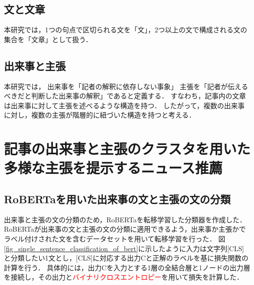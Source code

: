 \documentclass[12pt,a4j]{jreport}
\begin{document}
\subsection{文と文章}
本研究では，1つの句点で区切られる文を「文」，2つ以上の文で構成される文の集合を「文章」として扱う．

\subsection{出来事と主張}
本研究では，
出来事を「記者の解釈に依存しない事象」
主張を「記者が伝えるべきだと判断した出来事の解釈」であると定義する．
すなわち，記事内の文章は出来事に対して主張を述べるような構造を持つ．
したがって，複数の出来事に対し，複数の主張が階層的に紐づいた構造を持つと考える．


\section{記事の出来事と主張のクラスタを用いた多様な主張を提示するニュース推薦}
\label{section_method_detail}



\subsection{RoBERTaを用いた出来事の文と主張の文の分類}
\label{subsection_classify_method}
出来事と主張の文の分類のため，RoBERTaを転移学習した分類器を作成した．
RoBERTaが出来事の文と主張の文の分類に適用できるよう，出来事か主張かでラベル付けされた文を含むデータセットを用いて転移学習を行った．
図\ref{fig_single_sentence_classification_of_bert}に示したように入力は文字列[CLS]と分類したい1文とし，[CLS]に対応する出力Cと正解のラベルを基に損失関数の計算を行う．
具体的には，出力Cを入力とする1層の全結合層と1ノードの出力層を接続し，その出力と\textcolor{red}{バイナリクロスエントロピー}を用いて損失を計算した．
\end{document}
